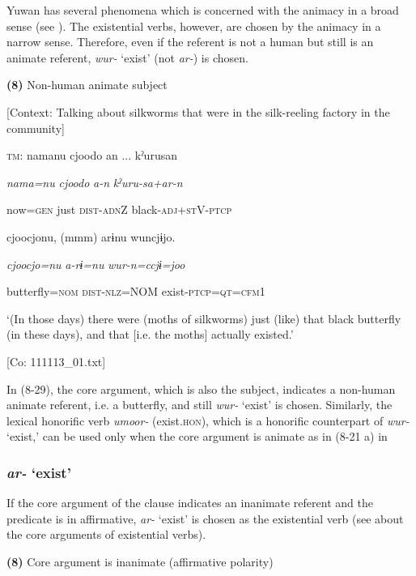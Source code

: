 Yuwan has several phenomena which is concerned with the animacy in a broad sense (see ). The existential verbs, however, are chosen by the animacy in a narrow sense. Therefore, even if the referent is not a human but still is an animate referent, \textit{wur-} ‘exist’ (not \textit{ar-}) is chosen.

\textbf{(8)}  Non-human animate subject

  [Context: Talking about silkworms that were in the silk-reeling factory in the community]

  \textsc{tm}:  namanu  cjoodo  an ...  kˀurusan

    \textit{nama=nu}  \textit{cjoodo}  \textit{a-n}  \textit{kˀuru-sa+ar-n}

    now=\textsc{gen}  just  \textsc{dist}-\textsc{adn}Z  black-\textsc{adj}+\textsc{st}V-\textsc{ptcp}

    cjoocjonu,  (mmm)  arɨnu  wuncjɨjo.

    \textit{cjoocjo=nu}    \textit{a-rɨ=nu}  \textit{wur{}-n=ccjɨ=joo}

    butterfly=\textsc{nom}    \textsc{dist}-\textsc{nlz}=NOM  exist-\textsc{ptcp}=\textsc{qt}=\textsc{cfm}1

    ‘(In those days) there were (moths of silkworms) just (like) that black butterfly (in these days), and that [i.e. the moths] actually existed.’

    [Co: 111113\_01.txt]

In (8-29), the core argument, which is also the subject, indicates a non-human animate referent, i.e. a butterfly, and still \textit{wur-} ‘exist’ is chosen. Similarly, the lexical honorific verb \textit{umoor-} (exist.\textsc{hon}), which is a honorific counterpart of \textit{wur-} ‘exist,’ can be used only when the core argument is animate as in (8-21 a) in 

\subsubsection{\textit{ar-} ‘exist’}

If the core argument of the clause indicates an inanimate referent and the predicate is in affirmative, \textit{ar-} ‘exist’ is chosen as the existential verb (see  about the core arguments of existential verbs).

\textbf{(8)}  Core argument is inanimate (affirmative polarity)

